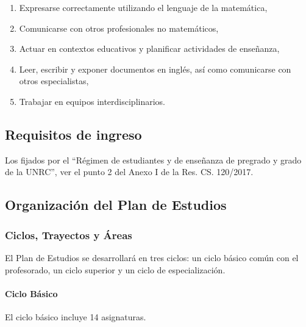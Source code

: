 \documentclass[a4paper, 12pt]{article}
\begin{document}
\begin{enumerate}
\item {Expresarse correctamente
utilizando el lenguaje de la
matemática,} 
 


\item {Comunicarse
con otros profesionales no matemáticos,} 

 

\item {Actuar en contextos educativos y planificar actividades de enseñanza,} 
 


\item {Leer, escribir y exponer documentos en
inglés, así como comunicarse con otros
especialistas,} 

 


\item {Trabajar en equipos
interdisciplinarios.} 

\end{enumerate}


\subsection{Requisitos de ingreso}



Los fijados por el ``Régimen  de estudiantes y de enseñanza de pregrado y grado de la UNRC'', ver  el punto 2 del Anexo I de la Res. CS. 120/2017. 



\subsection{Organización del Plan de Estudios}

\subsubsection{Ciclos, Trayectos  y Áreas} El Plan de Estudios se desarrollará en tres ciclos:
un ciclo básico común con el profesorado, un ciclo superior y un
ciclo de especialización.

\paragraph{Ciclo Básico} El ciclo básico incluye 14 asignaturas.
\end{document}
